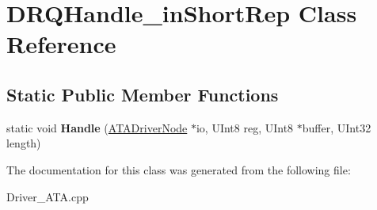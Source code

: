 \hypertarget{class_d_r_q_handle__in_short_rep}{}\section{D\+R\+Q\+Handle\+\_\+in\+Short\+Rep Class Reference}
\label{class_d_r_q_handle__in_short_rep}
\subsection*{Static Public Member Functions}
\begin{DoxyCompactItemize}
\item 
\mbox{\label{class_d_r_q_handle__in_short_rep_a551704e1c7b47db16b18ab840ee492fa}} 
static void {\bfseries Handle} (\hyperlink{class_a_t_a_driver_node}{A\+T\+A\+Driver\+Node} $\ast$io, U\+Int8 reg, U\+Int8 $\ast$buffer, U\+Int32 length)
\end{DoxyCompactItemize}


The documentation for this class was generated from the following file\+:\begin{DoxyCompactItemize}
\item 
Driver\+\_\+\+A\+T\+A.\+cpp\end{DoxyCompactItemize}
